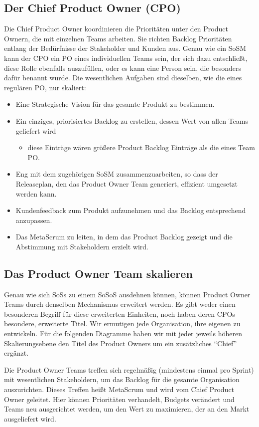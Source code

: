 \documentclass[12pt,a4paper,parskip=full]{scrartcl}
\begin{document}
\subsection{Der Chief Product Owner (CPO)}
Die Chief Product Owner koordinieren die Prioritäten unter den Product Ownern,
die mit einzelnen Teams arbeiten. Sie richten Backlog Prioritäten entlang der
Bedürfnisse der Stakeholder und Kunden aus. Genau wie ein SoSM kann der CPO ein
PO eines individuellen Teams sein, der sich dazu entschließt, diese Rolle
ebenfalls auszufüllen, oder es kann eine Person sein, die besonders dafür
benannt wurde. Die wesentlichen Aufgaben sind dieselben, wie die eines
regulären PO, nur skaliert:
\begin{itemize}
\item Eine Strategische Vision für das gesamte Produkt zu bestimmen.
\item Ein einziges, priorisiertes Backlog zu erstellen, dessen Wert von
allen Teams geliefert wird
\begin{itemize}
\item diese Einträge wären größere Product Backlog Einträge als die eines Team PO.
\end{itemize}
\item Eng mit dem zugehörigen SoSM zusammenzuarbeiten, so dass der Releaseplan, den das Product Owner Team generiert, effizient umgesetzt werden kann.
\item Kundenfeedback zum Produkt aufzunehmen und das Backlog entsprechend anzupassen.
\item Das MetaScrum zu leiten, in dem das Product Backlog gezeigt und die Abstimmung mit Stakeholdern erzielt wird.
\end{itemize}

\subsection{Das Product Owner Team skalieren}
Genau wie sich SoSs zu einem SoSoS ausdehnen können, können Product Owner
Teams durch denselben Mechanismus erweitert werden. Es gibt weder einen
besonderen Begriff für diese erweiterten Einheiten, noch haben deren CPOs
besondere, erweiterte Titel. Wir ermutigen jede Organisation, ihre eigenen zu
entwickeln. Für die folgenden Diagramme haben wir mit jeder jeweils höheren
Skalierungsebene den Titel des Product Owners um ein zusätzliches ``Chief''
ergänzt.

Die Product Owner Teams treffen sich regelmäßig (mindestens einmal pro Sprint) mit wesentlichen Stakeholdern, um das Backlog für die gesamte Organisation auszurichten. Dieses Treffen heißt MetaScrum und wird vom Chief Product Owner geleitet. Hier können Prioritäten verhandelt, Budgets verändert und Teams neu ausgerichtet werden, um den Wert zu maximieren, der an den Markt ausgeliefert wird.
\end{document}
